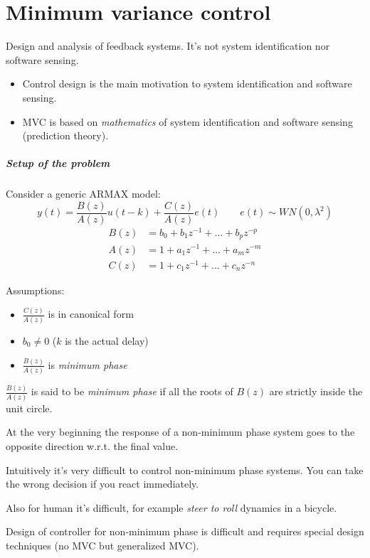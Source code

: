 
\chapter{Minimum variance control}

Design and analysis of feedback systems.
It's not system identification nor software sensing.

\begin{itemize}
    \item Control design is the main motivation to system identification and software sensing.
    \item MVC is based on \emph{mathematics} of system identification and software sensing (prediction theory).
\end{itemize}

\paragraph{Setup of the problem} Consider a generic ARMAX model:
\[
    y(t) = \frac{B(z)}{A(z)}u(t-k) + \frac{C(z)}{A(z)}e(t) \qquad e(t) \sim WN(0, \lambda^2)
\]
\begin{align*}
    B(z) &= b_0 + b_1z^{-1} + \dots + b_pz^{-p} \\
    A(z) &= 1   + a_1z^{-1} + \dots + a_mz^{-m} \\
    C(z) &= 1   + c_1z^{-1} + \dots + c_nz^{-n}
\end{align*}

Assumptions:
\begin{itemize}
    \item $\frac{C(z)}{A(z)}$ is in canonical form
    \item $b_0\ne 0$ ($k$ is the actual delay)
    \item $\frac{B(z)}{A(z)}$ is \emph{minimum phase}
\end{itemize}

\begin{remark}
    $\frac{B(z)}{A(z)}$ is said to be \emph{minimum phase} if all the roots of $B(z)$ are strictly inside the unit circle.


    At the very beginning the response of a non-minimum phase system goes to the opposite direction w.r.t. the final value.


    Intuitively it's very difficult to control non-minimum phase systems.
    You can take the wrong decision if you react immediately.

    Also for human it's difficult, for example \emph{steer to roll} dynamics in a bicycle.

    Design of controller for non-minimum phase is difficult and requires special design techniques (no MVC but generalized MVC).
\end{remark}

